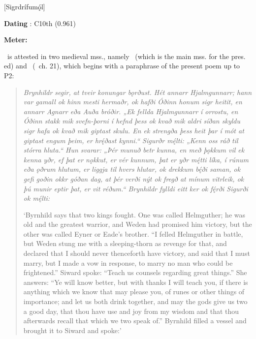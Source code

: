[Sigrdrífumǫ́l]

\begin{flushright}%
\textbf{Dating} \parencite{Sapp2022}: C10th (0.961)

\textbf{Meter:} \Ljodahattr%
\end{flushright}



\Sigrdrifumal\ is attested in two medieval mss., namely \Regius\ (which is the main mss. for the pres. ed) and \VolsungaMS\ (\VolsungaSaga\ ch. 21), which begins with a paraphrase of the present poem up to P2:

\begin{quote}
  \emph{Brynhildr segir, at tveir konungar bǫrðust. Hét annarr Hjalmgunnarr; hann var gamall ok hinn mesti hermaðr, ok hafði Óðinn honum sigr heitit, en annarr Agnarr eða Auða bróðir. „Ek fellda Hjalmgunnarr í orrostu, en Óðinn stakk mik svefn-þorni í hefnd þess ok kvað mik aldri síðan skyldu sigr hafa ok kvað mik giptast skulu. En ek strengða þess heit þar í mót at giptast engum þeim, er hrę́ðast kynni.“ Sigurðr mę́lti: „Kenn oss ráð til stórra hluta.“ Hun svarar: „Þér munuð betr kunna, en með þǫkkum vil ek kenna yðr, ef þat er nǫkkut, er vér kunnum, þat er yðr mę́tti líka, í rúnum eða ǫðrum hlutum, er liggja til hvers hlutar, ok drekkum bę́ði saman, ok gefi goðin okkr góðan dag, at þér verði nýt ok fregð at mínum vitrleik, ok þú munir eptir þat, er vit réðum.“ Brynhildr fylldi eitt ker ok fę́rði Sigurði ok mę́lti:}

  ‘Byrnhild says that two kings fought. One was called Helmguther; he was old and the greatest warrior, and Weden had promised him victory,
  but the other was called Eyner or Eade’s brother. “I felled Helmguther in battle, but Weden stung me with a sleeping-thorn as revenge for that, and declared that I should never thenceforth have victory, and said that I must marry, but I made a vow in response, to marry no man who could be frightened.” Siward spoke: “Teach us counsels regarding great things.” She answers: “Ye will know better, but with thanks I will teach you, if there is anything which we know that may please you, of runes or other things of importance; and let us both drink together, and may the gods give us two a good day, that thou have use and joy from my wisdom and that thou afterwards recall that which we two speak of.” Byrnhild filled a vessel and brought it to Siward and spoke:’
\end{quote}

